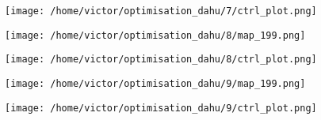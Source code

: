 \documentclass[../../Main_ManuscritThese.tex]{subfiles}
\begin{document}
\begin{figure}[ht]
  \centering
  \texttt{[image: /home/victor/optimisation\_dahu/7/ctrl\_plot.png]}
\end{figure}
\clearpage
\begin{figure}[ht]
  \centering
  \texttt{[image: /home/victor/optimisation\_dahu/8/map\_199.png]}
\end{figure}
\begin{figure}[ht]
  \centering
  \texttt{[image: /home/victor/optimisation\_dahu/8/ctrl\_plot.png]}
\end{figure}
\clearpage
\begin{figure}[ht]
  \centering
  \texttt{[image: /home/victor/optimisation\_dahu/9/map\_199.png]}
\end{figure}
\begin{figure}[ht]
  \centering
  \texttt{[image: /home/victor/optimisation\_dahu/9/ctrl\_plot.png]}
\end{figure}
\clearpage




\pagestyle{appendixStyle}



\subfileLocal{
	\pagestyle{empty}
	
	

}

\endgroup
\end{document}
